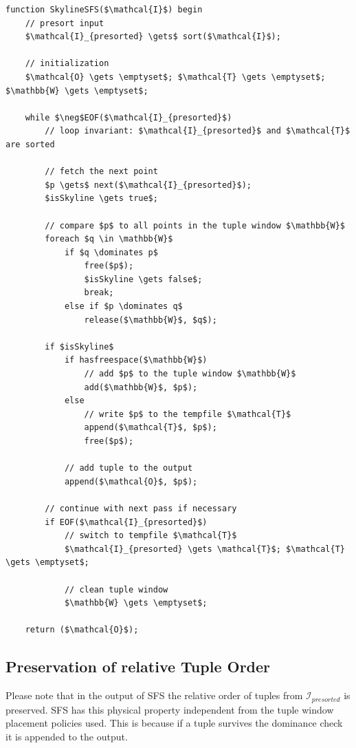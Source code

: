 \begin{lstlisting}[language=pseudo,
caption={Pseudo-code for Sort-First-Skyline (SFS) Algorithm},
label={code:sfs}
]
function SkylineSFS($\mathcal{I}$) begin 
	// presort input
	$\mathcal{I}_{presorted} \gets$ sort($\mathcal{I}$);

	// initialization
	$\mathcal{O} \gets \emptyset$; $\mathcal{T} \gets \emptyset$; $\mathbb{W} \gets \emptyset$;

	while $\neg$EOF($\mathcal{I}_{presorted}$)
		// loop invariant: $\mathcal{I}_{presorted}$ and $\mathcal{T}$ are sorted

		// fetch the next point
		$p \gets$ next($\mathcal{I}_{presorted}$);
		$isSkyline \gets true$;

		// compare $p$ to all points in the tuple window $\mathbb{W}$
		foreach $q \in \mathbb{W}$
			if $q \dominates p$
				free($p$);
				$isSkyline \gets false$;
				break;
			else if $p \dominates q$
				release($\mathbb{W}$, $q$);

		if $isSkyline$
			if hasfreespace($\mathbb{W}$)
				// add $p$ to the tuple window $\mathbb{W}$
				add($\mathbb{W}$, $p$);
			else
				// write $p$ to the tempfile $\mathcal{T}$
				append($\mathcal{T}$, $p$);
				free($p$);

			// add tuple to the output
			append($\mathcal{O}$, $p$);

		// continue with next pass if necessary
		if EOF($\mathcal{I}_{presorted}$)
			// switch to tempfile $\mathcal{T}$
			$\mathcal{I}_{presorted} \gets \mathcal{T}$; $\mathcal{T} \gets \emptyset$;

			// clean tuple window
			$\mathbb{W} \gets \emptyset$;

	return ($\mathcal{O}$);
\end{lstlisting}

\subsection{Preservation of relative Tuple Order}
\label{sec:sfs-tuple-order}
Please note that in the output of SFS the relative order of tuples
from $\mathcal{I}_{presorted}$ is preserved.  SFS has this physical
property independent from the tuple window placement policies used.
This is because if a tuple survives the dominance check it is appended
to the output.



